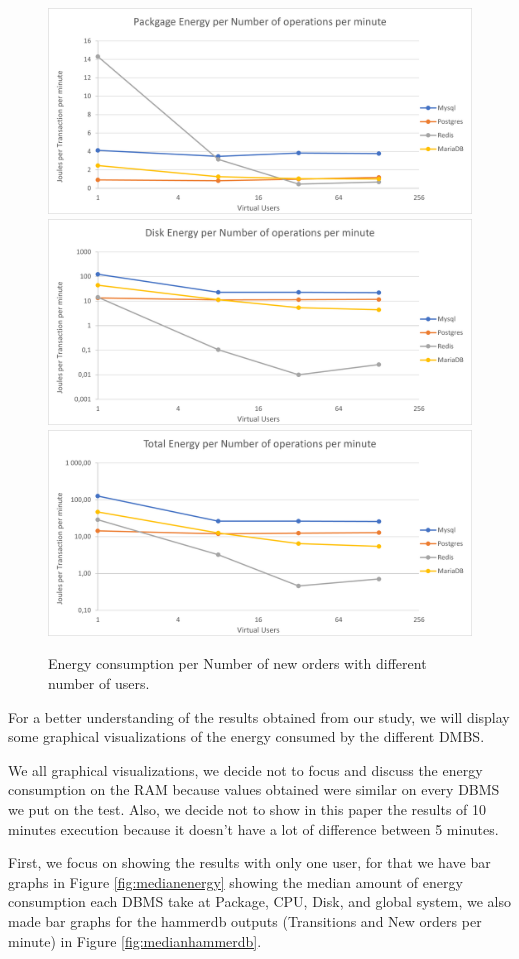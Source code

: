\begin{figure}[h!]
\centering
\caption{Energy consumption per Number of new orders with different number of users.}
\includegraphics[width=0.76\columnwidth]{results/vu/Packgage-nopm.png}
\includegraphics[width=0.76\columnwidth]{results/vu/Disk-nopm.png}
\includegraphics[width=0.76\columnwidth]{results/vu/Total-nopm.png}
\label{fig:vuyenergynopm}	
\end{figure}

For a better understanding of the results obtained from our study, we will display some graphical visualizations of the energy consumed by the different DMBS.

We all graphical visualizations, we decide not to focus and discuss the energy consumption on the RAM because values obtained were similar on every DBMS we put on the test. Also, we decide not to show in this paper the results of 10 minutes execution because it doesn't have a lot of difference between 5 minutes.

First, we focus on showing the results with only one user, for that we have bar graphs in Figure \ref{fig:medianenergy} showing the median amount of energy consumption each DBMS take at Package, CPU, Disk, and global system, we also made bar graphs for the hammerdb outputs (Transitions and New orders per minute) in Figure  \ref{fig:medianhammerdb}.

